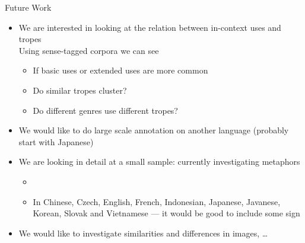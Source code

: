 \documentclass[dvipsnames]{beamer}
\begin{document}
\begin{frame}{Future Work}

  \begin{itemize}
  \item We are interested in looking at
    the relation between in-context uses
    and tropes
  \\  Using sense-tagged corpora we can see 
    \begin{itemize}
    \item If basic uses or extended uses are more common
    \item Do similar tropes cluster?
    \item Do different genres use different tropes?
    \end{itemize}
  \item We would like to do large scale
    annotation on another language
    (probably start with Japanese)
  \item We are looking in detail at a small sample: currently investigating
     metaphors
    \begin{itemize}
    \item  {}
    \item In Chinese, Czech, English, French,
      Indonesian, Japanese, Javanese,
      Korean, Slovak and Vietnamese  --- it would be good to include some sign
    \end{itemize}
  \item We would like to investigate similarities and differences in images, \ldots
  \end{itemize}
\end{frame}
\end{document}
